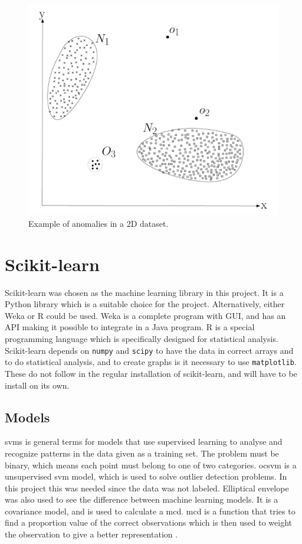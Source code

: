 \begin{figure}
\centering
\includegraphics[scale=0.3]{figs/anomaly_example.png}
\caption{\label{fig:anomalyExample}Example of anomalies in a 2D dataset\citep{chandola2009anomaly}.}
\end{figure}



\section{Scikit-learn}
Scikit-learn was chosen as the machine learning library in this project. It is a Python library which is a suitable choice for the project. Alternatively, either Weka or R could be used. Weka is a complete program with GUI, and has an API making it possible to integrate in a Java program. R is a special programming language which is specifically designed for statistical analysis. Scikit-learn depends on \texttt{numpy} and \texttt{scipy} to have the data in correct arrays and to do statistical analysis, and to create graphs is it necessary to use \texttt{matplotlib}. These do not follow in the regular installation of scikit-learn, and will have to be install on its own. 

\subsection{Models}
\glspl{svm} is general terms for models that use supervised learning to analyse and recognize patterns in the data given as a training set. The problem must be binary, which means each point must belong to one of two categories. \gls{ocsvm} is a unsupervised \gls{svm} model, which is  used to solve outlier detection problems. In this project this was needed since the data was not labeled. Elliptical envelope was also used to see the difference between machine learning models. It is a covariance model, and is used to calculate a \gls{mcd}. \gls{mcd} is a function that tries to find a proportion value of the correct observations which is then used to weight the observation to give a better representation \cite{scikit-learn}.